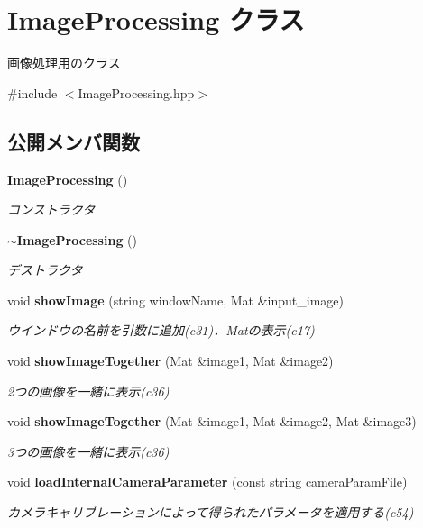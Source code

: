 \section{Image\-Processing クラス}
\label{class_image_processing}


画像処理用のクラス  




{\ttfamily \#include $<$Image\-Processing.\-hpp$>$}

\subsection*{公開メンバ関数}
\begin{DoxyCompactItemize}
\item 
{\bf Image\-Processing} ()
\begin{DoxyCompactList}\small\item\em コンストラクタ \end{DoxyCompactList}\item 
{\bf $\sim$\-Image\-Processing} ()
\begin{DoxyCompactList}\small\item\em デストラクタ \end{DoxyCompactList}\item 
void {\bf show\-Image} (string window\-Name, Mat \&input\-\_\-image)
\begin{DoxyCompactList}\small\item\em ウインドウの名前を引数に追加(c31)．\-Matの表示(c17) \end{DoxyCompactList}\item 
void {\bf show\-Image\-Together} (Mat \&image1, Mat \&image2)
\begin{DoxyCompactList}\small\item\em 2つの画像を一緒に表示(c36) \end{DoxyCompactList}\item 
void {\bf show\-Image\-Together} (Mat \&image1, Mat \&image2, Mat \&image3)
\begin{DoxyCompactList}\small\item\em 3つの画像を一緒に表示(c36) \end{DoxyCompactList}\item 
void {\bf load\-Internal\-Camera\-Parameter} (const string camera\-Param\-File)
\begin{DoxyCompactList}\small\item\em カメラキャリブレーションによって得られたパラメータを適用する(c54) \end{DoxyCompactList}\item 

\end{DoxyCompactItemize}
